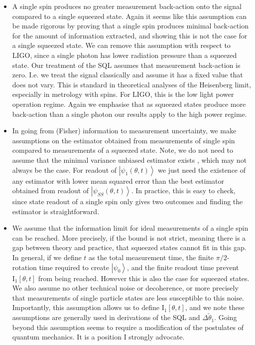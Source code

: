 \documentclass[reqno]{amsart}
\def\est#1{\tilde{#1}}
\newcommand{\ket}[1]{\left| #1 \right>}
\def\funcwrt#1#2#3{\mathrm{#1}_{\mathrm{#3}}\left[#2\right]}
\begin{document}
\begin{itemize}
\item A single spin produces no greater measurement back-action onto the signal compared to a single squeezed state. Again it seems like this assumption can be made rigorous by proving that a single spin produces minimal back-action for the amount of information extracted, and showing this is not the case for a single squeezed state. We can remove this assumption with respect to LIGO, since a single photon has lower radiation pressure than a squeezed state. Our treatment of the SQL assumes that measurement back-action is zero. I.e. we treat the signal classically and assume it has a fixed value that does not vary. This is standard in theoretical analyses of the Heisenberg limit, especially in metrology with spins. For LIGO, this is the low light power operation regime. Again we emphasise that as squeezed states produce more back-action than a single photon our results apply to the high power regime.
\item In going from (Fisher) information to measurement uncertainty, we make assumptions on the estimator obtained from measurements of single spin compared to measurements of a squeezed state. Note, we do not need to assume that the minimal variance unbiased estimator exists \cite{Kay1993}, which may not always be the case. For readout of $\ket{\psi_1(\theta,t)}$ we just need the existence of any estimator with lower mean squared error than the best estimator obtained from readout of $\ket{\psi_{SS}(\theta,t)}$. In practice, this is easy to check, since state readout of a single spin only gives two outcomes and finding the estimator is straightforward.
\item We assume that the information limit for ideal measurements of a single spin can be reached. More precisely, if the bound is not strict, meaning there is a gap between theory and practice, that squeezed states cannot fit in this gap. In general, if we define $t$ as the total measurement time, the finite $\pi/2$-rotation time required to create $\ket{\psi_0}$, and the finite readout time prevent $\funcwrt{I}{\theta,t}{1}$ from being reached. However this is also the case for squeezed states. We also assume no other technical noise or decoherence, or more precisely that measurements of single particle states are less susceptible to this noise. Importantly, this assumption allows us to define $\funcwrt{I}{\theta,t}{1}$, and we note these assumptions are generally used in derivations of the SQL and $\Delta \est{\theta}_1$. Going beyond this assumption seems to require a modification of the postulates of quantum mechanics. It is a position I strongly advocate.
\\
\end{itemize}
\end{document}
